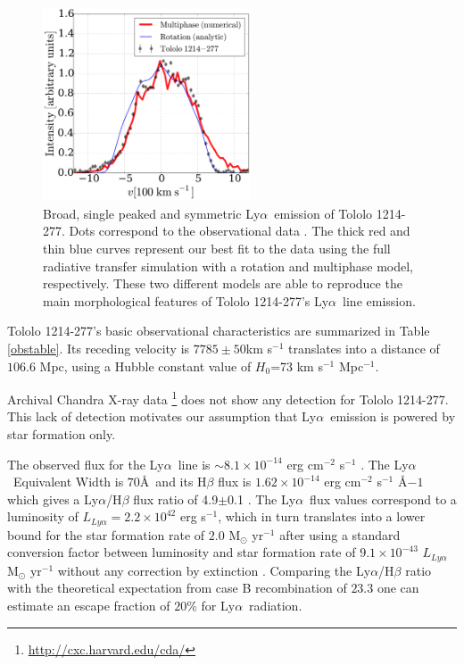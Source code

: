 \documentclass[a4,useAMS,usenatbib,usegraphicx]{mn2e}
\newcommand{\tol}{Tololo 1214-277}
\newcommand{\lya}{Ly$\alpha$}
\begin{document}
\begin{figure}
\begin{center}
\includegraphics[width=0.55\textwidth]{CLARA-TOL-main.pdf}
\caption{Broad, single peaked and symmetric \lya\ emission of \tol.
  Dots correspond to the observational data \citep{mashesse03}. 
The thick red and thin blue curves represent our best fit
to the data using the full radiative transfer simulation with a
rotation and multiphase model, respectively. 
These two different models are able to reproduce the main morphological
features of \tol's \lya\ line emission.\label{fig:results}}
\end{center}
\end{figure}

\tol's basic observational characteristics are summarized in Table \ref{obstable}.
Its receding velocity is $7785\pm 50$km s$^{-1}$ translates
into a distance of $106.6$ Mpc, using a Hubble constant value of $H_{0}$=73
km s$^{-1}$ Mpc$^{-1}$.

Archival Chandra X-ray data \footnote{\url{http://cxc.harvard.edu/cda/}} does not show any
detection for \tol. 
This lack of detection motivates our assumption that \lya\ emission is
powered by star formation only.



The observed flux for the \lya\ line is $\sim
8.1\times 10^{-14}$ erg cm$^{-2}$ s$^{-1}$ \citep{Thuan97}.
The \lya\ Equivalent Width is $70$\AA\ and its H$\beta$ flux is 
$1.62\times 10^{-14}$ erg cm$^{-2}$ s$^{-1}$ \AA${-1}$
which gives a \lya/H$\beta$ flux ratio of
4.9$\pm$0.1 \citep{Izotov04}.
The \lya\ flux values correspond to a luminosity of
$L_{Ly\alpha}=2.2\times 10^{42}$ erg s$^{-1}$, which in turn
translates  into a lower bound for the star formation rate of $2.0$
M$_{\odot}$ yr$^{-1}$ after using a standard conversion factor between
luminosity and star formation rate of $9.1\times 10^{-43}$
$L_{Ly\alpha}$ M$_{\odot}$ yr$^{-1}$ 
without any
correction by extinction
\citep{Kennicutt98}.
Comparing the \lya/H$\beta$ ratio with the theoretical
expectation from case B recombination of $23.3$ \citep{Hummer1987} one
can estimate an escape fraction of $20$\% for \lya\ radiation.
\end{document}
